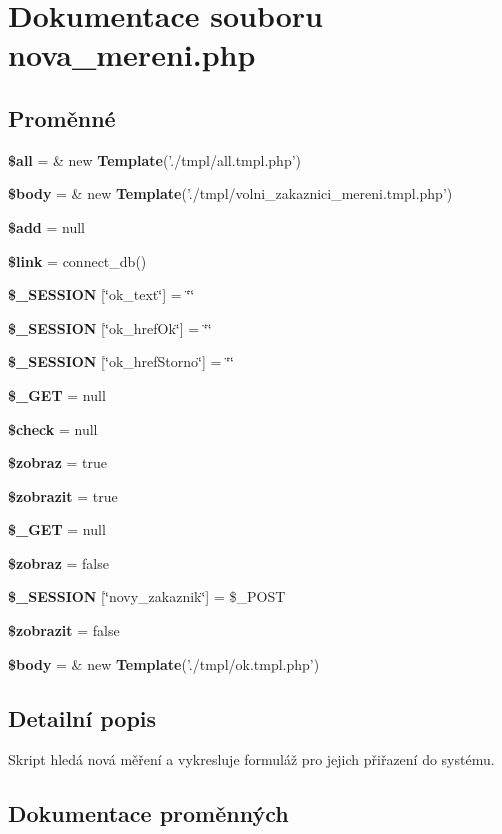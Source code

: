 \section{Dokumentace souboru nova\_\-mereni.php}
\label{nova__mereni_8php}
\subsection*{Proměnné}
\begin{CompactItemize}
\item 
{\bf \$all} = \& new {\bf Template}('./tmpl/all.tmpl.php')
\item 
{\bf \$body} = \& new {\bf Template}('./tmpl/volni\_\-zakaznici\_\-mereni.tmpl.php')
\item 
{\bf \$add} = null
\item 
{\bf \$link} = connect\_\-db()
\item 
{\bf \$\_\-SESSION} [\char`\"{}ok\_\-text\char`\"{}] = \char`\"{}\char`\"{}
\item 
{\bf \$\_\-SESSION} [\char`\"{}ok\_\-hrefOk\char`\"{}] = \char`\"{}\char`\"{}
\item 
{\bf \$\_\-SESSION} [\char`\"{}ok\_\-hrefStorno\char`\"{}] = \char`\"{}\char`\"{}
\item 
{\bf \$\_\-GET} = null
\item 
{\bf \$check} = null
\item 
{\bf \$zobraz} = true
\item 
{\bf \$zobrazit} = true
\item 
{\bf \$\_\-GET} = null
\item 
{\bf \$zobraz} = false
\item 
{\bf \$\_\-SESSION} [\char`\"{}novy\_\-zakaznik\char`\"{}] = \$\_\-POST
\item 
{\bf \$zobrazit} = false
\item 
{\bf \$body} = \& new {\bf Template}('./tmpl/ok.tmpl.php')
\end{CompactItemize}


\subsection{Detailní popis}
Skript hledá nová měření a vykresluje formuláž pro jejich přiřazení do systému. 

\subsection{Dokumentace proměnných}
